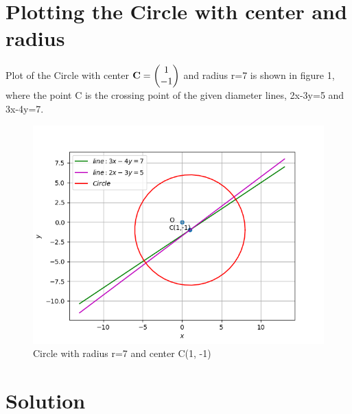 \documentclass[journal,10pt,twocolumn]{article}
\begin{document}
{\section{Plotting the Circle with center and radius}
\vspace{0.25cm}
Plot of the Circle with center $\mathbf{C} =\begin{pmatrix}1\\-1\end{pmatrix}$ and radius r=7  is shown in figure 1, where the point C is the crossing point of the given diameter lines, 2x-3y=5 and 3x-4y=7.
\begin{figure}[h]
\includegraphics[width=1\columnwidth]{circle.png}
\caption{Circle with radius r=7 and center C(1, -1)}
\label{fig:Circle with radius and center}
\end{figure}
\section{Solution}
\vspace{0.25cm}
}
\end{document}
